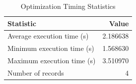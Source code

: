 
\begin{table}[h!]
\centering
\begin{tabular}{l r}
\hline
Statistic & Value \\
\hline
Average execution time (s) & 2.186638 \\
Minimum execution time (s) & 1.568630 \\
Maximum execution time (s) & 3.510970 \\
Number of records & 4 \\
\hline
\end{tabular}
\caption{Optimization Timing Statistics}
\end{table}
